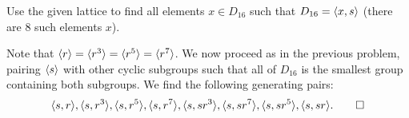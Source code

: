  Use the given lattice to find all elements $x\in D_{16}$
such that $D_{16} = \langle{x, s}\rangle$ (there are $8$ such elements $x$).
\begin{solution}
  Note that $\langle{r}\rangle = \langle{r^3}\rangle = \langle{r^5}\rangle = \langle{r^7}\rangle$. We now
  proceed as in the previous problem, pairing $\langle{s}\rangle$ with other
  cyclic subgroups such that all of $D_{16}$ is the smallest group
  containing both subgroups. We find the following generating pairs:
  \begin{equation*}
    \langle{s,r}\rangle,\langle{s,r^3}\rangle,\langle{s,r^5}\rangle,\langle{s,r^7}\rangle,
    \langle{s,sr^3}\rangle, \langle{s,sr^7}\rangle,\langle{s,sr^5}\rangle,\langle{s,sr}\rangle.
    \qedhere
  \end{equation*}
\end{solution}
